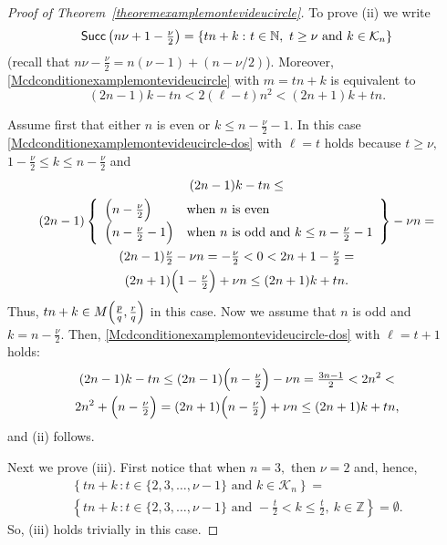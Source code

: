 \documentclass[a4paper, 11pt]{amsart}
\numberwithin{equation}{section}
\theoremstyle{customnumberedtheorem}
\theoremstyle{definitionwithbfnote}
\newcommand{\N}{\ensuremath{\mathbb{N}}}
\newcommand{\Z}{\ensuremath{\mathbb{Z}}}
\DeclareMathOperator{\Succ}{\textsf{\upshape Succ}}
\newcommand{\succs}[1]{\ensuremath{\Succ\left(#1\right)}}
\newcommand{\set}[2]{\ensuremath{\left\{#1 \,\colon #2\right\}}}
\begin{document}
\begin{proof}[Proof of Theorem~\ref{theoremexamplemontevideucircle}]
To prove (ii) we write
\[
\succs{n\nu+1-\tfrac{\nu}{2}} = \set{tn+k}{t \in \N,\ t \ge \nu\text{ and } k \in \mathcal{K}_n}
\]
(recall that $n\nu - \tfrac{\nu}{2} = n(\nu-1) + (n-\nu/2)$).
Moreover, \eqref{Mcdconditionexamplemontevideucircle} with $m = tn+k$
is equivalent to
\begin{equation}\label{Mcdconditionexamplemontevideucircle-dos}
  (2n-1) k - t n < 2(\ell - t)n^2 < (2n+1) k + t n.
\end{equation}

Assume first that either $n$ is even or $k \le n - \tfrac{\nu}{2} -1.$
In this case \eqref{Mcdconditionexamplemontevideucircle-dos}
with $\ell = t$ holds because
$t \ge \nu,$ $1-\tfrac{\nu}{2} \le k \le n-\tfrac{\nu}{2}$ and
\begin{multline*}
 (2n-1)k - t n \le\\
 (2n-1) \left\{\begin{array}{ll}
  \Bigl(n-\tfrac{\nu}{2}\Bigr)   & \text{when $n$ is even}\\
  \Bigl(n-\tfrac{\nu}{2}-1\Bigr) & \text{when $n$ is odd and $k \le n - \tfrac{\nu}{2} -1$}
 \end{array}\right\} - \nu n =\\
 (2n-1)\tfrac{\nu}{2} - \nu n = -\tfrac{\nu}{2} < 0 < 2n+1 - \tfrac{\nu}{2} =\\
 (2n+1)\Bigl(1-\tfrac{\nu}{2}\Bigr) + \nu n \le (2n+1)k + t n .
\end{multline*}
Thus, $tn+k \in M\Bigl(\tfrac{p}{q}, \tfrac{r}{q}\Bigr)$ in this case.
Now we assume that $n$ is odd and $k = n - \tfrac{\nu}{2}.$
Then, \eqref{Mcdconditionexamplemontevideucircle-dos}
with $\ell = t+1$ holds:
\begin{multline*}
 (2n-1)k - t n \le (2n-1)\Bigl(n - \tfrac{\nu}{2}\Bigr) -  \nu n = \tfrac{3n-1}{2} < 2n^2 < \\
 2n^2 + \Bigl(n - \tfrac{\nu}{2}\Bigr) = (2n+1)\Bigl(n - \tfrac{\nu}{2}\Bigr) + \nu n \le (2n+1)k + t n,
\end{multline*}
and (ii) follows.

Next we prove (iii).
First notice that when $n = 3,$ then $\nu = 2$ and, hence,
\begin{multline*}
 \set{tn+k}{t \in \{2,3,\dots,\nu-1\}\text{ and } k \in \mathcal{K}_n} =  \\
 \set{t n + k}{t \in \{2,3,\dots,\nu-1\} \text{ and } -\tfrac{t}{2} < k \le \tfrac{t}{2},\ k \in \Z} = \emptyset.
\end{multline*}
So, (iii) holds trivially in this case.


\end{proof}
\end{document}
